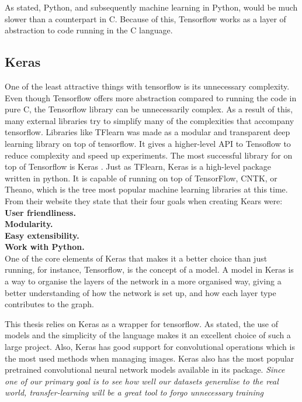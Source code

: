 As stated, Python, and subsequently machine learning in Python, would be much slower than a counterpart in C. Because of this, Tensorflow works as a layer of abstraction to code running in the C language. 
 



\subsection{Keras}
One of the least attractive things with tensorflow is its unnecessary complexity.  Even though Tensorflow offers more abstraction compared to running the code in pure C, the Tensorflow library can be unnecessarily complex.
As a result of this, many external libraries try to simplify many of the complexities that accompany tensorflow. 
Libraries like TFlearn was made as a modular and transparent deep learning library on top of tensorflow. It gives a higher-level API to Tensoflow to reduce complexity and speed up experiments. 
The most successful library for on top of Tensorflow is Keras . 
Just as TFlearn, Keras is a high-level package written in python. It is capable of running on top of TensorFlow, CNTK, or Theano, which is the tree most popular machine learning libraries at this time. 
From their website they state that their four goals when creating Kears were:
\textbf{User friendliness. }\\
\textbf{Modularity. }\\
\textbf{Easy extensibility.}\\ 
\textbf{Work with Python. }\\

One of the core elements of Keras that makes it a better choice than just running, for instance, Tensorflow, is the concept of a model. A model in Keras is a way to organise the layers of the network in a more organised way, giving a better understanding of how the network is set up, and how each layer type contributes to the graph. 

This thesis relies on Keras as a wrapper for tensorflow. As stated, the use of models and the simplicity of the language makes it an excellent choice of such a large project. Also, Keras has good support for convolutional operations which is the most used methods when managing images. Keras also has the most popular pretrained convolutional neural network models available in its package. \textit{Since one of our primary goal is to see how well our datasets generalise to the real world, transfer-learning will be a great tool to forgo unnecessary training}






